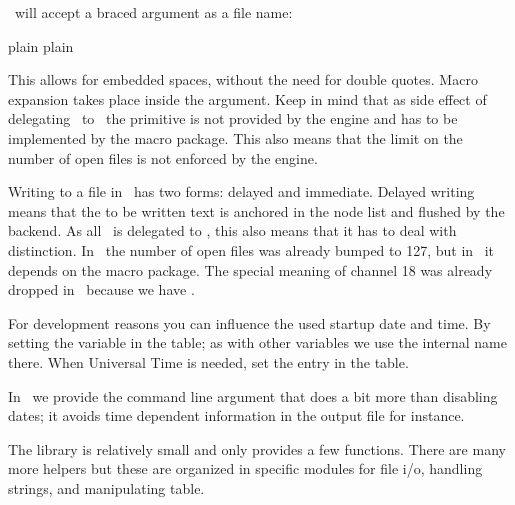 \stopsection

\startsection[title={Files}]

\startsubsection[title={File syntax}]

\LUAMETATEX\ will accept a braced argument as a file name:

\starttyping
 {plain}
 {plain}
\stoptyping

This allows for embedded spaces, without the need for double quotes. Macro
expansion takes place inside the argument. Keep in mind that as side effect of
delegating \IO\ to \LUA\ the  primitive is not provided by the
engine and has to be implemented by the macro package. This also means that the
limit on the number of open files is not enforced by the engine.

\stopsubsection

\startsubsection[title={Writing to file}]

Writing to a file in \TEX\ has two forms: delayed and immediate. Delayed writing
means that the to be written text is anchored in the node list and flushed by the
backend. As all \IO\ is delegated to \LUA, this also means that it has to deal
with distinction. In \LUATEX\ the number of open files was already bumped to 127,
but in \LUAMETATEX\ it depends on the macro package. The special meaning of
channel 18 was already dropped in \LUATEX\ because we have .

\stopsubsection

\stopsection

\startsection[title={Testing}]

For development reasons you can influence the used startup date and time. By
setting the  variable in the  table; as with
other variables we use the internal name there. When Universal Time is needed,
set the entry  in the  table.

In \CONTEXT\ we provide the command line argument  that does
a bit more than disabling dates; it avoids time dependent information in the
output file for instance.

\stopsection

\startsection[title={Helpers}]

\startsubsection[title=Basics]

The  library is relatively small and only provides a few functions.
There are many more helpers but these are organized in specific modules for file
i/o, handling strings, and manipulating table.

